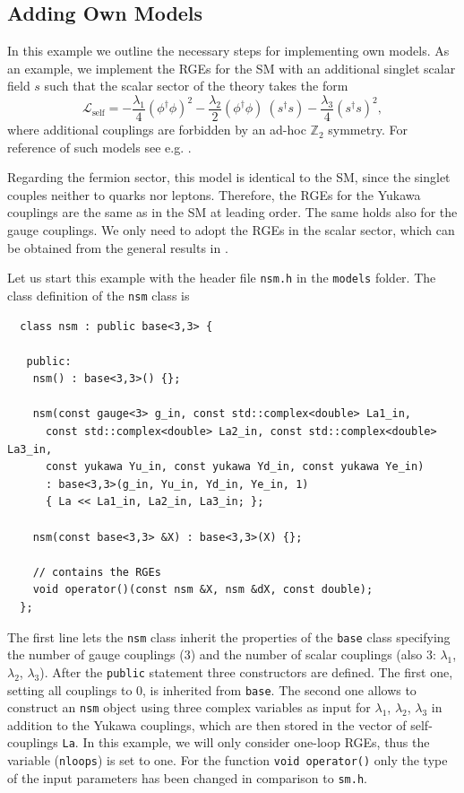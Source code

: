 \documentclass[11pt,a4paper]{article}
\begin{document}
\subsection{\label{sec::adding} Adding Own Models}
In this example we outline the necessary steps for implementing own models. As an example, we implement the RGEs for the SM with an additional singlet scalar field $s$ such that the scalar sector of the theory takes the form
\begin{equation} \label{eq:nsm_la}
  \mathcal{L}_{\mathrm{self}} = -\frac{\lambda_1}{4} (\phi^\dagger\phi)^2  -\frac{\lambda_2}{2} (\phi^\dagger\phi)\ (s^\dagger s)   -\frac{\lambda_3}{4} (s^\dagger s)^2 ,
\end{equation}
where additional couplings are forbidden by an ad-hoc $\mathbb{Z}_2$ symmetry. For reference of such models see e.g. \cite{Schabinger:2005ei,Patt:2006fw,Bowen:2007ia}.

Regarding the fermion sector, this model is identical to the SM, since the singlet couples neither to quarks nor leptons. Therefore, the RGEs for the Yukawa couplings are the same as in the SM at leading order.
The same holds also for the gauge couplings. We only need to adopt the RGEs in the scalar sector, which can be obtained from the general results in \cite{Machacek:1984zw,Poole:2019kcm}.

Let us start this example with the header file \texttt{nsm.h} in the \texttt{models} folder. The class definition of the \texttt{nsm} class is
\begin{lstlisting}
  class nsm : public base<3,3> {
  
   public:
    nsm() : base<3,3>() {};

    nsm(const gauge<3> g_in, const std::complex<double> La1_in,
      const std::complex<double> La2_in, const std::complex<double> La3_in,
      const yukawa Yu_in, const yukawa Yd_in, const yukawa Ye_in)
      : base<3,3>(g_in, Yu_in, Yd_in, Ye_in, 1)
      { La << La1_in, La2_in, La3_in; };

    nsm(const base<3,3> &X) : base<3,3>(X) {};
 
    // contains the RGEs
    void operator()(const nsm &X, nsm &dX, const double);
  };
\end{lstlisting}
The first line lets the \texttt{nsm} class inherit the properties of the \texttt{base} class specifying the number of gauge couplings (3) and the number of scalar couplings (also 3: $\lambda_1$, $\lambda_2$, $\lambda_3$).
After the \texttt{public} statement three constructors are defined. The first one, setting all couplings to 0, is inherited from \texttt{base}.
The second one allows to construct an \texttt{nsm} object using three complex variables as input for $\lambda_1$, $\lambda_2$, $\lambda_3$ in addition to the Yukawa couplings,
which are then stored in the vector of self-couplings \texttt{La}.
In this example, we will only consider one-loop RGEs, thus the variable (\texttt{nloops}) is set to one.
For the function \texttt{void operator()} only the type of the input parameters has been changed in comparison to \texttt{sm.h}.
\end{document}
